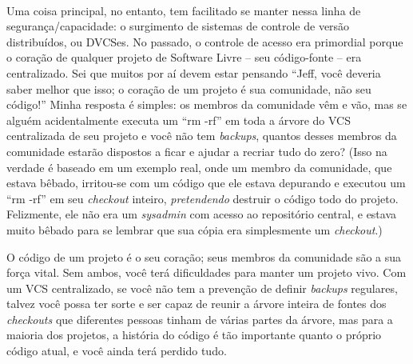 \paragraph*{}Uma coisa principal, no entanto, tem facilitado se manter nessa linha
de segurança/capacidade: o surgimento de sistemas de controle de versão distribuídos,
ou DVCSes. No passado, o controle de acesso era primordial porque o coração de qualquer
projeto de Software Livre -- seu código-fonte -- era centralizado. Sei que muitos por aí
devem estar pensando ``Jeff, você deveria saber melhor que isso; o coração de um projeto
é sua comunidade, não seu código!'' Minha resposta é simples: os membros da comunidade
vêm e vão, mas se alguém acidentalmente executa um ``rm -rf'' em toda a árvore do VCS
centralizada de seu projeto e você não tem \textit{backups}, quantos desses membros da
comunidade estarão dispostos a ficar e ajudar a recriar tudo do zero? (Isso na verdade
é baseado em um exemplo real, onde um membro da comunidade, que estava bêbado, irritou-se
com um código que ele estava depurando e executou um ``rm -rf'' em seu \textit{checkout}
inteiro, \emph{pretendendo} destruir o código todo do projeto. Felizmente, ele não era
um \textit{sysadmin} com acesso ao repositório central, e estava muito bêbado para se
lembrar que sua cópia era simplesmente um \textit{checkout}.)

O código de um projeto é o seu coração; seus membros da comunidade são a sua
força vital. Sem ambos, você terá dificuldades para manter um projeto vivo.
Com um VCS centralizado, se você não tem a prevenção de definir \textit{backups}
regulares, talvez você possa ter sorte e ser capaz de reunir a árvore inteira
de fontes dos \textit{checkouts} que diferentes pessoas tinham de várias partes
da árvore, mas para a maioria dos projetos, a história do código é tão importante
quanto o próprio código atual, e você ainda terá perdido tudo.


